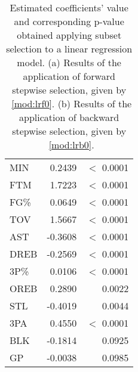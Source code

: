 \begin{table}[h]
\begin{subtable}{0.4\textwidth}
{\begin{tabular}{|| l | r | r ||}
			MIN & 0.2439 & $<$ 0.0001 \\
			FTM & 1.7223 & $<$ 0.0001 \\
			FG\% & 0.0649 & $<$ 0.0001 \\
			TOV & 1.5667 & $<$ 0.0001 \\
			AST & -0.3608 & $<$ 0.0001 \\
			DREB & -0.2569 & $<$ 0.0001 \\
			3P\% & 0.0106 & $<$ 0.0001 \\
			OREB & 0.2890 & 0.0022 \\
			STL & -0.4019 & 0.0044 \\
			3PA & 0.4550 & $<$ 0.0001 \\
			BLK & -0.1814 & 0.0925 \\
			GP & -0.0038 & 0.0985 \\
			\hline
		\end{tabular}%
		}	
		\caption{}
		\label{table:BackwardModelSummary}
	\end{subtable}
	\caption{Estimated coefficients' value and corresponding p-value obtained applying subset selection to a linear regression model. (a) Results of the application of forward stepwise selection, given by \Mod~\ref{mod:lrf0}. (b) Results of the application of backward stepwise selection, given by \Mod~\ref{mod:lrb0}.}
	\label{table:SubSelModSum}
\end{table}

\begin{center}
\end{center}

\begin{center}
\end{center}

